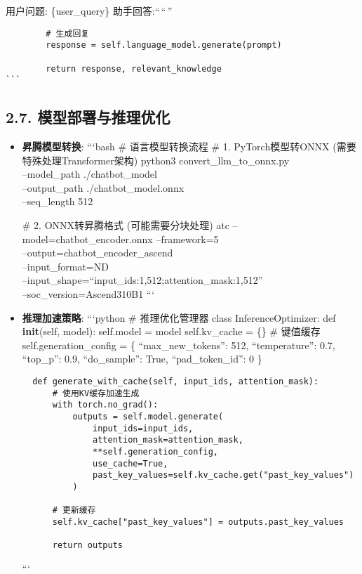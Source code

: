 用户问题: \{user\_query\} 助手回答:``\,``\,''

\begin{lstlisting}
        # 生成回复
        response = self.language_model.generate(prompt)
        
        return response, relevant_knowledge
```
\end{lstlisting}

\subsection{2.7.
模型部署与推理优化}\label{ux6a21ux578bux90e8ux7f72ux4e0eux63a8ux7406ux4f18ux5316}

\begin{itemize}
\item
  \textbf{昇腾模型转换}: ```bash \# 语言模型转换流程 \# 1.
  PyTorch模型转ONNX (需要特殊处理Transformer架构) python3
  convert\_llm\_to\_onnx.py\\
  --model\_path ./chatbot\_model\\
  --output\_path ./chatbot\_model.onnx\\
  --seq\_length 512

  \# 2. ONNX转昇腾格式 (可能需要分块处理) atc
  --model=chatbot\_encoder.onnx --framework=5\\
  --output=chatbot\_encoder\_ascend\\
  --input\_format=ND\\
  --input\_shape=``input\_ids:1,512;attention\_mask:1,512''\\
  --soc\_version=Ascend310B1 ```
\item
  \textbf{推理加速策略}: ```python \# 推理优化管理器 class
  InferenceOptimizer: def \textbf{init}(self, model): self.model = model
  self.kv\_cache = \{\} \# 键值缓存 self.generation\_config = \{
  ``max\_new\_tokens'': 512, ``temperature'': 0.7, ``top\_p'': 0.9,
  ``do\_sample'': True, ``pad\_token\_id'': 0 \}

\begin{lstlisting}
  def generate_with_cache(self, input_ids, attention_mask):
      # 使用KV缓存加速生成
      with torch.no_grad():
          outputs = self.model.generate(
              input_ids=input_ids,
              attention_mask=attention_mask,
              **self.generation_config,
              use_cache=True,
              past_key_values=self.kv_cache.get("past_key_values")
          )

      # 更新缓存
      self.kv_cache["past_key_values"] = outputs.past_key_values

      return outputs
\end{lstlisting}

  ```
\end{itemize}

